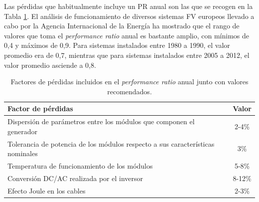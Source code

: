Las pérdidas que habitualmente incluye un PR anual son las que se
recogen en la Tabla \ref{tab:PR}. El análisis de funcionamiento de diversos sistemas FV europeos llevado
a cabo por la Agencia Internacional de la Energía
\cite{Nordmann2014} ha mostrado que el rango de valores
que toma el \emph{performance ratio} anual es bastante amplio, con mínimos
de 0,4 y máximos de 0,9. Para sistemas instalados entre 1980 a 1990, el valor promedio era de 0,7, mientras que para sistemas instalados entre 2005 a 2012, el valor promedio asciende a 0,8.
%
\begin{table}
  \caption{Factores de pérdidas incluidos en el \emph{performance
      ratio} anual junto con valores recomendados.\label{tab:PR}}

\begin{tabular}{>{\centering}p{8cm}c}
  \toprule 
  Factor de pérdidas & Valor\tabularnewline
                       \midrule
                       \midrule 
                       Dispersión de parámetros entre los módulos que componen el generador  & 2-4\%\tabularnewline
                                                                                               \midrule 
                                                                                               Tolerancia de potencia de los módulos respecto a sus características
                                                                                               nominales  & 3\%\tabularnewline
                                                                                                            \midrule 
                                                                                                            Temperatura de funcionamiento de los módulos  & 5-8\%\tabularnewline
                                                                                                                                                            \midrule 
                                                                                                                                                            Conversión DC/AC realizada por el inversor & 8-12\%\tabularnewline
                                                                                                                                                                                                         \midrule 
                                                                                                                                                                                                         Efecto Joule en los cables  & 2-3\%\tabularnewline

\end{tabular}
\end{table}
